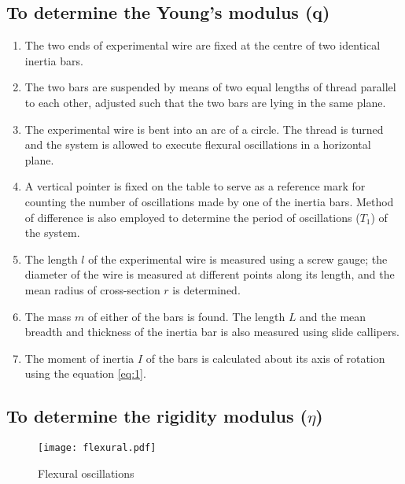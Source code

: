 \documentclass[12pt,a4paper]{article}
\begin{document}
		\subsection{To determine the Young's modulus (q)}
		\begin{enumerate}
			\item	The two ends of experimental wire are fixed at the centre of two identical inertia bars.
			
			\item	The two bars are suspended by means of two equal lengths of thread parallel to each other, adjusted such that the two bars are lying in the same plane.
			
			\item	The experimental wire is bent into an arc of a circle. The thread is turned and the system is allowed to execute flexural oscillations in a horizontal plane.
			
			\item	A vertical pointer is fixed on the table to serve as a reference mark for counting the number of oscillations made by one of the inertia bars. Method of difference is also employed to determine the period of oscillations ($T_{1}$) of the system. 
			
			\item	The length $l$ of the experimental wire is measured using a screw gauge; the diameter of the wire is measured at different points along its length, and the mean radius of cross-section $r$ is determined.
			
			\item	The mass $m$ of either of the bars is found. The length $L$ and the mean breadth and thickness of the inertia bar is also measured using slide callipers. 
			
			\item	The moment of inertia $I$ of the bars is calculated about its axis of rotation using the equation  \ref{eq:1}.
		\end{enumerate}
		
		\subsection{To determine the rigidity modulus ($\eta$)}
		
				\begin{figure}[!htb]
					\centering
					\texttt{[image: flexural.pdf]}
					\caption{Flexural oscillations}
				\end{figure}
				
\end{document}
